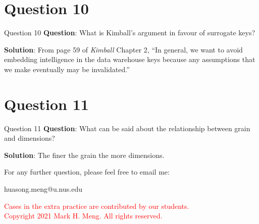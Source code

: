 \section*{Question 10}

\begin{frame}[fragile]{Question 10}
	\textbf{Question}: What is Kimball's argument in favour of surrogate keys?\\\vspace{10pt}
	
	\textbf{Solution}: From page 59 of \textit{Kimball} Chapter 2, ``In general, we want to avoid embedding intelligence in the data warehouse keys because any assumptions that we make eventually may be invalidated.''
\end{frame}

\section*{Question 11}

\begin{frame}[fragile]{Question 11}
	\textbf{Question}: What can be said about the relationship between grain and dimensions? \\\vspace{10pt}
	
	\textbf{Solution}: The finer the grain the more dimensions.
\end{frame}

\begin{frame}[fragile]{}
	\centering  
	For any further question, please feel free to email me:\vspace{10pt}
	
	huasong.meng@u.nus.edu \vspace{20pt}
	
	\begin{tcolorbox}
		\begin{center}
			\textcolor{red}{Cases in the extra practice are contributed by our students.\\\vspace{5pt}Copyright 2021 Mark H. Meng. All rights reserved.}
		\end{center}
	\end{tcolorbox}
\end{frame}
